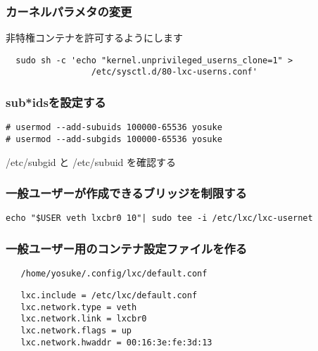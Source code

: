 \documentclass[cjk,dvipdfmx,12pt,compress,%
hyperref={bookmarks=true,bookmarksnumbered=true,bookmarksopen=false,%
colorlinks=false,%
pdftitle={第 120 回 関西 Debian 勉強会},%
pdfauthor={倉敷・のがた・佐々木・かわだ・おおつき},%
pdfsubject={資料},%
}]{beamer}
\begin{document}
\begin{frame}[fragile]
  \frametitle{カーネルパラメタの変更}
  \begin{block}{非特権コンテナを許可するようにします}
  \begin{verbatim}
  sudo sh -c 'echo "kernel.unprivileged_userns_clone=1" >
                 /etc/sysctl.d/80-lxc-userns.conf'
  \end{verbatim}
  \end{block}
\end{frame}

\begin{frame}[fragile]
  \frametitle{sub*idsを設定する}
  \begin{block}{}
  \begin{verbatim}
# usermod --add-subuids 100000-65536 yosuke
# usermod --add-subgids 100000-65536 yosuke
  \end{verbatim}
  \end{block}
  \begin{block}{}
/etc/subgid と /etc/subuid を確認する
  \end{block}
\end{frame}

\begin{frame}[fragile]
  \frametitle{一般ユーザーが作成できるブリッジを制限する}
  \begin{block}{}
  \begin{verbatim}
echo "$USER veth lxcbr0 10"| sudo tee -i /etc/lxc/lxc-usernet
  \end{verbatim}
  \end{block}
\end{frame}

\begin{frame}[fragile]
  \frametitle{一般ユーザー用のコンテナ設定ファイルを作る}
  \begin{block}{}
  \begin{verbatim}
   /home/yosuke/.config/lxc/default.conf
  \end{verbatim}
  \end{block}

  \begin{block}{}
  \begin{verbatim}
   lxc.include = /etc/lxc/default.conf
   lxc.network.type = veth
   lxc.network.link = lxcbr0
   lxc.network.flags = up
   lxc.network.hwaddr = 00:16:3e:fe:3d:13
  \end{verbatim}
  \end{block}
\end{frame}
   
\end{document}

